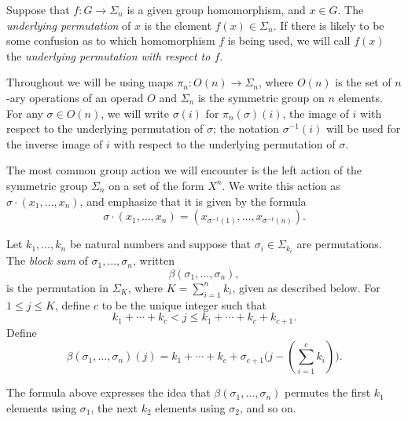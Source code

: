 \begin{Defi}\label{Defi:underlying-perm}
Suppose that $f \colon G \to \Sigma_n$ is a given group homomorphism, and $x \in G$. The \emph{underlying permutation} of $x$ is the element $f(x) \in \Sigma_n$. If there is likely to be some confusion as to which homomorphism $f$ is being used, we will call $f(x)$ the \emph{underlying permutation with respect to $f$}.
\end{Defi}

\begin{nota}\label{nota:perm_shorthand}
Throughout we will be using maps $\pi_n \colon O(n) \rightarrow \Sigma_n$, where $O(n)$ is the set of $n$-ary operations of an operad $O$ and $\Sigma_n$ is the symmetric group on $n$ elements.  
For any $\sigma \in O(n)$, we will write $\sigma(i)$ for $\pi_n(\sigma)(i)$, the image of $i$ with respect to the underlying permutation of $\sigma$; the notation $\sigma^{-1}(i)$ will be used for the inverse image of $i$ with respect to the underlying permutation of $\sigma$.
\end{nota}

\begin{rem}\label{rem:Sn-tuples}
The most common group action we will encounter is the left action of the symmetric group $\Sigma_n$ on a set of the form $X^n$.
We write this action as $\sigma \cdot (x_1, \ldots, x_n)$, and emphasize that it is given by the formula
\[
\sigma \cdot (x_1, \ldots, x_n) = (x_{\sigma^{-1}(1)}, \ldots, x_{\sigma^{-1}(n)}).
\]
\end{rem}

\begin{Defi}\label{Defi:beta-s}
Let $k_1, \ldots, k_n$ be natural numbers and suppose that $\sigma_i \in \Sigma_{k_i}$ are permutations. The \emph{block sum} of $\sigma_1, \ldots, \sigma_n$, written 
\[
\beta( \sigma_1, \ldots, \sigma_n ),
\]
is the permutation in $\Sigma_K$, where $K = \sum_{i=1}^n k_i$, given as described below. 
For $1 \leq j \leq K$, define $c$ to be the unique integer such that
\[
k_1 + \cdots + k_c < j \leq k_1 + \cdots + k_c +k_{c+1}.
\]
Define
\[
\beta( \sigma_1, \ldots, \sigma_n )(j) = k_1 + \cdots + k_c + \sigma_{c+1}\big( j - (\sum_{i=1}^c k_i) \big).
\]
\end{Defi}

\begin{rem}\label{rem:beta-s}
The formula above expresses the idea that $\beta( \sigma_1, \ldots, \sigma_n )$ permutes the first $k_1$ elements using $\sigma_1$, the next $k_2$ elements using $\sigma_2$, and so on.
\end{rem}

